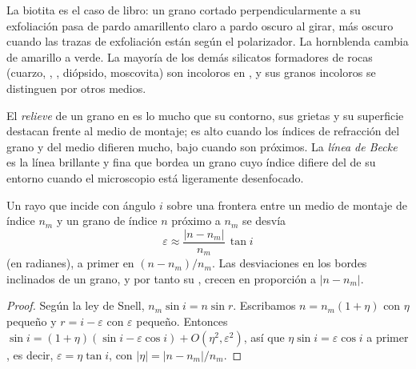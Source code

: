 La biotita es el caso de libro: un grano cortado perpendicularmente a su exfoliación pasa de pardo amarillento claro a
pardo oscuro al girar, más oscuro cuando las trazas de exfoliación están según el polarizador. La hornblenda cambia de
amarillo a verde. La mayoría de los demás silicatos formadores de rocas (cuarzo, , , diópsido,
moscovita) son incoloros en , y sus granos incoloros se distinguen por otros medios.

\begin{definition}\label{def:b1:optical-mineralogy:relief}
El \emph{relieve} de un grano en  es lo mucho que su contorno, sus grietas y su
superficie destacan frente al medio de montaje; es alto cuando los índices de refracción del grano y del medio difieren
mucho, bajo cuando son próximos. La \emph{línea de Becke} es la línea brillante y fina que
bordea un grano cuyo índice difiere del de su entorno cuando el microscopio está ligeramente desenfocado.
\end{definition}

\begin{proposition}\label{prop:b1:optical-mineralogy:relief}
Un rayo que incide con ángulo $i$ sobre una frontera entre un medio de montaje de índice $n_m$ y un grano de índice $n$
próximo a $n_m$ se desvía
\[
  \varepsilon \approx \frac{|n - n_m|}{n_m}\,\tan i
\]
(en radianes), a primer  en $(n - n_m)/n_m$. Las desviaciones en los bordes inclinados de un grano, y por tanto su
, crecen en proporción a $|n - n_m|$.
\end{proposition}

\begin{proof}
Según la ley de Snell, $n_m \sin i = n \sin r$. Escribamos $n = n_m(1 + \eta)$ con $\eta$ pequeño y $r = i - \varepsilon$
con $\varepsilon$ pequeño. Entonces $\sin i = (1 + \eta)(\sin i - \varepsilon\cos i) + O(\eta^2, \varepsilon^2)$, así que
$\eta \sin i = \varepsilon\cos i$ a primer , es decir, $\varepsilon = \eta\tan i$, con $|\eta| = |n - n_m|/n_m$.
\end{proof}

